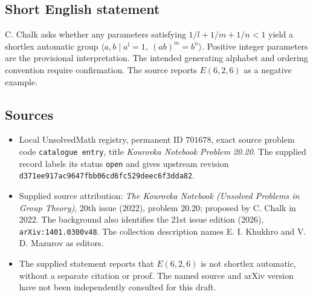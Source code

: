 \documentclass[11pt]{article}
\begin{document}
\subsection{Short English statement}
C. Chalk asks whether any parameters satisfying \(1/l+1/m+1/n<1\) yield a shortlex automatic group \(\langle a,b\mid a^l=1,\ (ab)^m=b^n\rangle\). Positive integer parameters are the provisional interpretation. The intended generating alphabet and ordering convention require confirmation. The source reports \(E(6,2,6)\) as a negative example.
\subsection{Sources}
\begin{itemize}
\item Local UnsolvedMath registry, permanent ID \(701678\), exact source problem code \texttt{catalogue entry}, title \emph{Kourovka Notebook Problem 20.20}. The supplied record labels its status \texttt{open} and gives upstream revision \texttt{d371ee917ac9647fbb06cd6fc529deec6f3dda82}.
\item Supplied source attribution: \emph{The Kourovka Notebook (Unsolved Problems in Group Theory)}, 20th issue (2022), problem 20.20; proposed by C. Chalk in 2022. The background also identifies the 21st issue edition (2026), \texttt{arXiv:1401.0300v48}. The collection description names E. I. Khukhro and V. D. Mazurov as editors.
\item The supplied statement reports that \(E(6,2,6)\) is not shortlex automatic, without a separate citation or proof. The named source and arXiv version have not been independently consulted for this draft.
\end{itemize}
\end{document}
